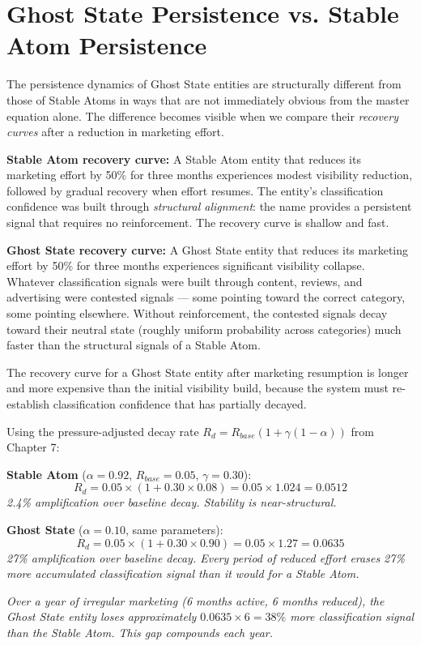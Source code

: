 \documentclass[12pt, openany]{book}
\theoremstyle{thmstyle}
\theoremstyle{defstyle}
\begin{document}
\section{Ghost State Persistence vs. Stable Atom Persistence}

The persistence dynamics of Ghost State entities are structurally different from those of Stable Atoms in ways that are not immediately obvious from the master equation alone. The difference becomes visible when we compare their \textit{recovery curves} after a reduction in marketing effort.

\textbf{Stable Atom recovery curve:}
A Stable Atom entity that reduces its marketing effort by 50\% for three months experiences modest visibility reduction, followed by gradual recovery when effort resumes. The entity's classification confidence was built through \textit{structural alignment}: the name provides a persistent signal that requires no reinforcement. The recovery curve is shallow and fast.

\textbf{Ghost State recovery curve:}
A Ghost State entity that reduces its marketing effort by 50\% for three months experiences significant visibility collapse. Whatever classification signals were built through content, reviews, and advertising were contested signals --- some pointing toward the correct category, some pointing elsewhere. Without reinforcement, the contested signals decay toward their neutral state (roughly uniform probability across categories) much faster than the structural signals of a Stable Atom.

The recovery curve for a Ghost State entity after marketing resumption is longer and more expensive than the initial visibility build, because the system must re-establish classification confidence that has partially decayed.

\begin{calcbox}
Using the pressure-adjusted decay rate $R_d = R_{base}(1 + \gamma(1-\alpha))$ from Chapter 7:

\textbf{Stable Atom} ($\alpha = 0.92$, $R_{base} = 0.05$, $\gamma = 0.30$):
\[
R_d = 0.05 \times (1 + 0.30 \times 0.08) = 0.05 \times 1.024 = 0.0512
\]
\textit{2.4\% amplification over baseline decay. Stability is near-structural.}

\textbf{Ghost State} ($\alpha = 0.10$, same parameters):
\[
R_d = 0.05 \times (1 + 0.30 \times 0.90) = 0.05 \times 1.27 = 0.0635
\]
\textit{27\% amplification over baseline decay. Every period of reduced effort erases 27\% more accumulated classification signal than it would for a Stable Atom.}

\textit{Over a year of irregular marketing (6 months active, 6 months reduced), the Ghost State entity loses approximately $0.0635 \times 6 = 38\%$ more classification signal than the Stable Atom. This gap compounds each year.}
\end{calcbox}
\end{document}
